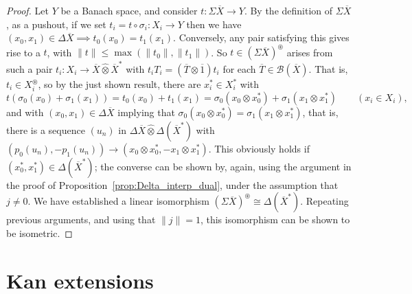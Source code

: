 \documentclass[a4paper,11pt]{article}
\theoremstyle{plain}
\theoremstyle{remark}
\newcommand{\mc}[1]{\mathcal{#1}}
\newcommand{\proten}{\widehat\otimes}
\newcommand{\intdual}{\circledast}
\begin{document}
\begin{proof}
Let $Y$ be a Banach space, and consider $t\colon \Sigma\overline X \to Y$.  By the definition of $\Sigma\overline X$, as a pushout, if we set $t_i = t\circ\sigma_i \colon X_i \to Y$ then we have $(x_0,x_1)\in\Delta\overline X \implies t_0(x_0) = t_1(x_1)$.  Conversely, any pair satisfying this gives rise to a $t$, with $\|t\| \leq \max(\|t_0\|, \|t_1\|)$.  So $t\in (\Sigma\overline X)^\intdual$ arises from such a pair $t_i \colon X_i \to \overline X \proten \overline X^*$ with $t_i T_i = (\overline T\otimes\overline 1)t_i$ for each $\overline T\in\mc B(\overline X)$.  That is, $t_i \in X_i^\intdual$, so by the just shown result, there are $x_i^*\in X_i^*$ with
\[ t(\sigma_0(x_0) + \sigma_1(x_1)) = t_0(x_0) + t_1(x_1)
= \sigma_0(x_0\otimes x_0^*) + \sigma_1(x_1\otimes x_1^*)
\qquad (x_i\in X_i), \]
and with $(x_0,x_1) \in \Delta\overline X$ implying that $\sigma_0(x_0\otimes x_0^*) = \sigma_1(x_1\otimes x_1^*)$, that is, there is a sequence $(u_n)$ in $\Delta\overline X \proten \Delta(\overline X^*)$ with $(p_0(u_n), -p_1(u_n)) \to (x_0\otimes x_0^*, -x_1\otimes x_1^*)$.  This obviously holds if $(x_0^*, x_1^*) \in \Delta(\overline X^*)$; the converse can be shown by, again, using the argument in the proof of Proposition~\ref{prop:Delta_interp_dual}, under the assumption that $j\not=0$.  We have established a linear isomorphism $(\Sigma\overline X)^\intdual \cong \Delta(\overline X^*)$.  Repeating previous arguments, and using that $\|j\|=1$, this isomorphism can be shown to be isometric.
\end{proof}


\section{Kan extensions}
\end{document}
